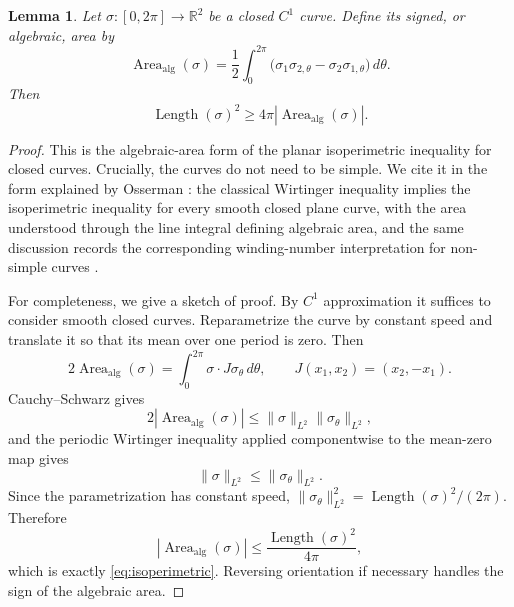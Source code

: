 \documentclass[11pt]{amsart}
\numberwithin{equation}{section}
\newtheorem{lemma}[theorem]{Lemma}
\theoremstyle{remark}
\newcommand{\R}{\mathbb{R}}
\newcommand{\AlgArea}{\operatorname{Area}_{\mathrm{alg}}}
\DeclareMathOperator{\Length}{Length}
\begin{document}
\begin{lemma}\label{lem:isoperimetric}
Let $\sigma\colon[0,2\pi]\to\R^2$ be a closed $C^1$ curve. Define its signed, or algebraic, area by
\[
\AlgArea(\sigma)=\frac12\int_0^{2\pi}\bigl(\sigma_1\sigma_{2,\theta}-\sigma_2\sigma_{1,\theta}\bigr)\, d\theta.
\]
Then
\begin{equation}\label{eq:isoperimetric}
\Length(\sigma)^2\ge 4\pi |\AlgArea(\sigma)|.
\end{equation}
\end{lemma}

\begin{proof}
This is the algebraic-area form of the planar isoperimetric inequality for closed curves. Crucially, the curves do not need to be simple. We
cite it in the form explained by Osserman \cite{Osserman1978}: the classical Wirtinger inequality implies the isoperimetric inequality for
every smooth closed plane curve, with the area understood through the line integral defining algebraic area, and the same discussion records
the corresponding winding-number interpretation for non-simple curves \cite[\S 1, Lemmas~1.1--1.2 and (1.8)]{Osserman1978}.

For completeness, we give a sketch of proof. By $C^1$ approximation it suffices to consider smooth closed curves. Reparametrize the curve by
constant speed and translate it so that its mean over one period is zero. Then
\[
2\AlgArea(\sigma)=\int_0^{2\pi}\sigma\cdot J\sigma_\theta\,d\theta,
\qquad J(x_1,x_2)=(x_2,-x_1).
\]
Cauchy--Schwarz gives
\[
2|\AlgArea(\sigma)|\le \|\sigma\|_{L^2}\|\sigma_\theta\|_{L^2},
\]
and the periodic Wirtinger inequality applied componentwise to the mean-zero map gives
\[
\|\sigma\|_{L^2}\le \|\sigma_\theta\|_{L^2}.
\]
Since the parametrization has constant speed, $\|\sigma_\theta\|_{L^2}^2=\Length(\sigma)^2/(2\pi)$. Therefore
\[
|\AlgArea(\sigma)|\le \frac{\Length(\sigma)^2}{4\pi},
\]
which is exactly \eqref{eq:isoperimetric}. Reversing orientation if necessary handles the sign of the algebraic area.
\end{proof}
\end{document}
